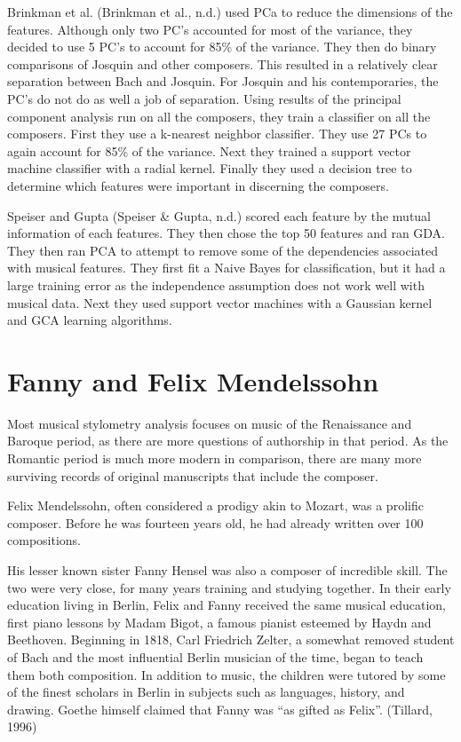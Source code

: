 \documentclass[12pt,twoside]{reedthesis}
\theoremstyle{definition}
\theoremstyle{definition}
\theoremstyle{definition}
\theoremstyle{remark}
\begin{document}
Brinkman et al. (Brinkman et al., n.d.) used PCa to reduce the
dimensions of the features. Although only two PC's accounted for most of
the variance, they decided to use 5 PC's to account for 85\% of the
variance. They then do binary comparisons of Josquin and other
composers. This resulted in a relatively clear separation between Bach
and Josquin. For Josquin and his contemporaries, the PC's do not do as
well a job of separation. Using results of the principal component
analysis run on all the composers, they train a classifier on all the
composers. First they use a k-nearest neighbor classifier. They use 27
PCs to again account for 85\% of the variance. Next they trained a
support vector machine classifier with a radial kernel. Finally they
used a decision tree to determine which features were important in
discerning the composers.

Speiser and Gupta (Speiser \& Gupta, n.d.) scored each feature by the
mutual information of each features. They then chose the top 50 features
and ran GDA. They then ran PCA to attempt to remove some of the
dependencies associated with musical features. They first fit a Naive
Bayes for classification, but it had a large training error as the
independence assumption does not work well with musical data. Next they
used support vector machines with a Gaussian kernel and GCA learning
algorithms.

\section{Fanny and Felix Mendelssohn}\label{fanny-and-felix-mendelssohn}

Most musical stylometry analysis focuses on music of the Renaissance and
Baroque period, as there are more questions of authorship in that
period. As the Romantic period is much more modern in comparison, there
are many more surviving records of original manuscripts that include the
composer.

Felix Mendelssohn, often considered a prodigy akin to Mozart, was a
prolific composer. Before he was fourteen years old, he had already
written over 100 compositions.

His lesser known sister Fanny Hensel was also a composer of incredible
skill. The two were very close, for many years training and studying
together. In their early education living in Berlin, Felix and Fanny
received the same musical education, first piano lessons by Madam Bigot,
a famous pianist esteemed by Haydn and Beethoven. Beginning in 1818,
Carl Friedrich Zelter, a somewhat removed student of Bach and the most
influential Berlin musician of the time, began to teach them both
composition. In addition to music, the children were tutored by some of
the finest scholars in Berlin in subjects such as languages, history,
and drawing. Goethe himself claimed that Fanny was ``as gifted as
Felix''. (Tillard, 1996)
\end{document}
